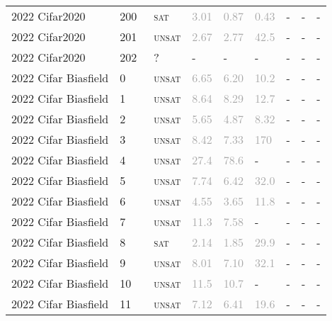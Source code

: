 \begin{center}
{\begin{longtable}{@{}lllllllll@{}}
2022 Cifar2020 & 200 & ~\textsc{sat} & \textcolor{darkgray}{3.01} & \textcolor{darkgray}{0.87} & \textcolor{darkgray}{0.43} & - & - & - \\
2022 Cifar2020 & 201 & ~\textsc{unsat} & \textcolor{darkgray}{2.67} & \textcolor{darkgray}{2.77} & \textcolor{darkgray}{42.5} & - & - & - \\
2022 Cifar2020 & 202 & ~? & - & - & - & - & - & - \\
\midrule
2022 Cifar Biasfield & 0 & ~\textsc{unsat} & \textcolor{darkgray}{6.65} & \textcolor{darkgray}{6.20} & \textcolor{darkgray}{10.2} & - & - & - \\
2022 Cifar Biasfield & 1 & ~\textsc{unsat} & \textcolor{darkgray}{8.64} & \textcolor{darkgray}{8.29} & \textcolor{darkgray}{12.7} & - & - & - \\
2022 Cifar Biasfield & 2 & ~\textsc{unsat} & \textcolor{darkgray}{5.65} & \textcolor{darkgray}{4.87} & \textcolor{darkgray}{8.32} & - & - & - \\
2022 Cifar Biasfield & 3 & ~\textsc{unsat} & \textcolor{darkgray}{8.42} & \textcolor{darkgray}{7.33} & \textcolor{darkgray}{170} & - & - & - \\
2022 Cifar Biasfield & 4 & ~\textsc{unsat} & \textcolor{darkgray}{27.4} & \textcolor{darkgray}{78.6} & - & - & - & - \\
2022 Cifar Biasfield & 5 & ~\textsc{unsat} & \textcolor{darkgray}{7.74} & \textcolor{darkgray}{6.42} & \textcolor{darkgray}{32.0} & - & - & - \\
2022 Cifar Biasfield & 6 & ~\textsc{unsat} & \textcolor{darkgray}{4.55} & \textcolor{darkgray}{3.65} & \textcolor{darkgray}{11.8} & - & - & - \\
2022 Cifar Biasfield & 7 & ~\textsc{unsat} & \textcolor{darkgray}{11.3} & \textcolor{darkgray}{7.58} & - & - & - & - \\
2022 Cifar Biasfield & 8 & ~\textsc{sat} & \textcolor{darkgray}{2.14} & \textcolor{darkgray}{1.85} & \textcolor{darkgray}{29.9} & - & - & - \\
2022 Cifar Biasfield & 9 & ~\textsc{unsat} & \textcolor{darkgray}{8.01} & \textcolor{darkgray}{7.10} & \textcolor{darkgray}{32.1} & - & - & - \\
2022 Cifar Biasfield & 10 & ~\textsc{unsat} & \textcolor{darkgray}{11.5} & \textcolor{darkgray}{10.7} & - & - & - & - \\
2022 Cifar Biasfield & 11 & ~\textsc{unsat} & \textcolor{darkgray}{7.12} & \textcolor{darkgray}{6.41} & \textcolor{darkgray}{19.6} & - & - & - \\

\end{longtable}}
\end{center}
